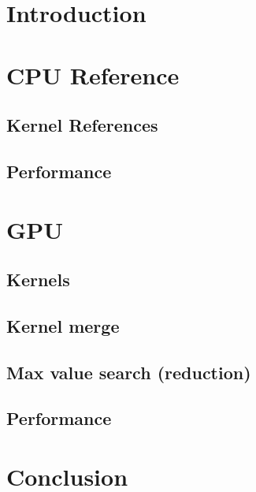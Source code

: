 \documentclass[11pt]{article}
\begin{document}
\begin{multicols*}{2}
  \section{Introduction}
  \section{CPU Reference}
  \subsection{Kernel References}
  \subsection{Performance}
  \section{GPU}
  \subsection{Kernels}
  \subsection{Kernel merge}
  \subsection{Max value search (reduction)}
  \subsection{Performance}
  \section{Conclusion}
\end{multicols*}
\end{document}
